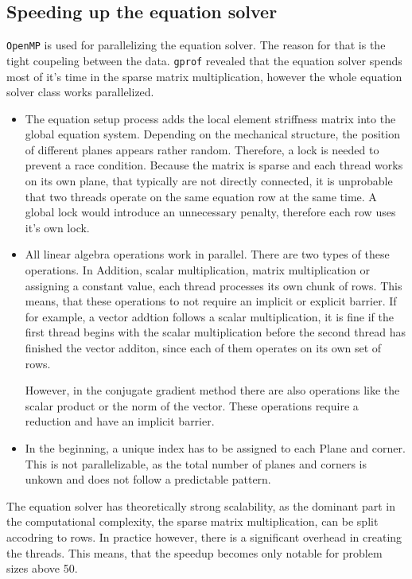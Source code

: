 \documentclass[12pt]{article}
\begin{document}
\subsection{Speeding up the equation solver}

\texttt{OpenMP} is used for parallelizing the equation solver. The reason for that is the tight coupeling between the data. \texttt{gprof} revealed that the equation solver spends most of it's time in the sparse matrix multiplication, however the whole equation solver class works parallelized.

\begin{itemize}
    \item The equation setup process adds the local element striffness matrix into the global equation system. Depending on the mechanical structure, the position of different planes appears rather random. Therefore, a lock is needed to prevent a race condition. Because the matrix is sparse and each thread works on its own plane, that typically are not directly connected, it is unprobable that two threads operate on the same equation row at the same time. A global lock would introduce an unnecessary penalty, therefore each row uses it's own lock.
    \item All linear algebra operations work in parallel. There are two types of these operations. In Addition, scalar multiplication, matrix multiplication or assigning a constant value, each thread processes its own chunk of rows. This means, that these operations to not require an implicit or explicit barrier. If for example, a vector addtion follows a scalar multiplication, it is fine if the first thread begins with the scalar multiplication before the second thread has finished the vector additon, since each of them operates on its own set of rows.
    
    However, in the conjugate gradient method there are also operations like the scalar product or the norm of the vector. These operations require a reduction and have an implicit barrier.
    \item In the beginning, a unique index has to be assigned to each Plane and corner. This is not parallelizable, as the total number of planes and corners is unkown and does not follow a predictable pattern.
\end{itemize}

The equation solver has theoretically strong scalability, as the dominant part in the computational complexity, the sparse matrix multiplication, can be split accodring to rows. In practice however, there is a significant overhead in creating the threads. This means, that the speedup becomes only notable for problem sizes above 50.
\end{document}
